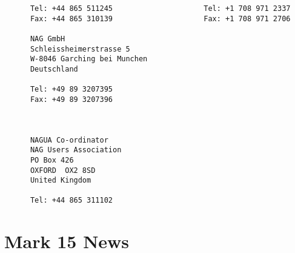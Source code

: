 \begin{small}
\begin{verbatim}
      Tel: +44 865 511245                     Tel: +1 708 971 2337              
      Fax: +44 865 310139                     Fax: +1 708 971 2706              
                                                                                
      NAG GmbH                                                                  
      Schleissheimerstrasse 5                                                   
      W-8046 Garching bei Munchen                                               
      Deutschland                                                               
                                                                                
      Tel: +49 89 3207395                                                       
      Fax: +49 89 3207396                                                       
                                                                                
                                                                                
                                                                                
      NAGUA Co-ordinator                                                        
      NAG Users Association                                                     
      PO Box 426                                                                
      OXFORD  OX2 8SD                                                           
      United Kingdom                                                            
                                                                                
      Tel: +44 865 311102                                                       
\end{verbatim}
\end{small}

\newpage
\section{Mark 15 News}
\label{se:news}

